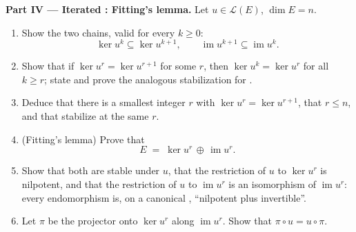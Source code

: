 \begin{problem}
\medskip
\noindent\textbf{Part IV --- Iterated : Fitting's lemma.}
Let $u \in \mathcal{L}(E)$, $\dim E = n$.
\begin{enumerate}[resume]
  \item Show the two chains, valid for every $k \geq 0$:
        \[
        \ker u^k \subseteq \ker u^{k+1},
        \qquad
        \operatorname{im} u^{k+1} \subseteq \operatorname{im}
        u^k .
        \]
  \item Show that if $\ker u^{r} = \ker u^{r+1}$ for some $r$,
        then $\ker u^{k} = \ker u^{r}$ for all $k \geq r$; state
        and prove the analogous stabilization for .
  \item Deduce that there is a smallest integer $r$ with $\ker
        u^{r} = \ker u^{r+1}$, that $r \leq n$, and that 
        stabilize at the same $r$.
  \item (Fitting's lemma) Prove that
        \[
        E \;=\; \ker u^{r} \,\oplus\, \operatorname{im} u^{r} .
        \]
  \item Show that both  are stable under $u$, that the
        restriction of $u$ to $\ker u^{r}$ is nilpotent, and that
        the restriction of $u$ to $\operatorname{im} u^{r}$ is an
        isomorphism of $\operatorname{im} u^{r}$: every
        endomorphism is, on a canonical , ``nilpotent
        plus invertible''.
  \item Let $\pi$ be the projector onto $\ker u^{r}$ along
        $\operatorname{im} u^{r}$. Show that $\pi \circ u = u
        \circ \pi$.
\end{enumerate}


\end{problem}
